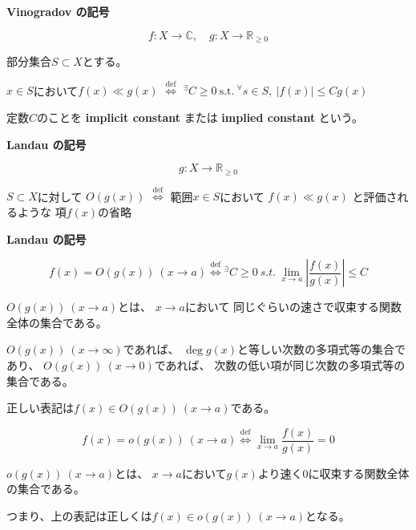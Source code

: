 \documentclass[12pt,b5paper]{ltjsarticle}
\begin{document}
\hrulefill

\textbf{Vinogradov の記号}

\begin{equation}
 f:X\to\mathbb{C},\quad
  g:X\to\mathbb{R}_{\geq 0}
\end{equation}

部分集合$S\subset X$とする。

\begin{center}
 $x\in S$において$f(x) \ll g(x)$
 $\overset{\mathrm{def}}{\iff}$
 ${}^{\exists}C\geq 0 \ \text{s.t.} \
 {}^{\forall}s\in S, \ \lvert f(x) \rvert \leq Cg(x)$
\end{center}

定数$C$のことを
\textbf{implicit constant}
または
\textbf{implied constant}
という。


\textbf{Landau の記号}

\begin{equation}
 g:X\to\mathbb{R}_{\geq0}
\end{equation}

$S\subset X$に対して
$O(g(x))$
$\overset{\mathrm{def}}{\iff}$
範囲$x\in S$において
$f(x)\ll g(x)$
と評価されるような
項$f(x)$の省略



\textbf{Landau の記号}

\begin{equation}
 f(x)=O(g(x)) \ (x\to a)
  \overset{\mathrm{def}}{\iff}
  {}^{\exists}C\geq 0
  \ s.t. \
 \lim_{x\to a}
 \left\lvert \frac{f(x)}{g(x)} \right\rvert \leq C
\end{equation}

$O(g(x)) \ (x\to a)$とは、
$x\to a$において
同じぐらいの速さで収束する関数全体の集合である。

$O(g(x)) \ (x\to \infty)$であれば、
$\deg{g(x)}$と等しい次数の多項式等の集合であり、
$O(g(x)) \ (x\to 0)$であれば、
次数の低い項が同じ次数の多項式等の集合である。

正しい表記は$f(x) \in O(g(x)) \ (x\to a)$である。

\begin{equation}
 f(x)=o(g(x)) \ (x\to a)
  \overset{\mathrm{def}}{\iff}
 \lim_{x\to a}\frac{f(x)}{g(x)} = 0
\end{equation}

$o(g(x)) \ (x\to a)$とは、
$x\to a$において$g(x)$より速く$0$に収束する関数全体の集合である。

つまり、上の表記は正しくは$f(x)\in o(g(x)) \ (x\to a)$となる。
\end{document}
